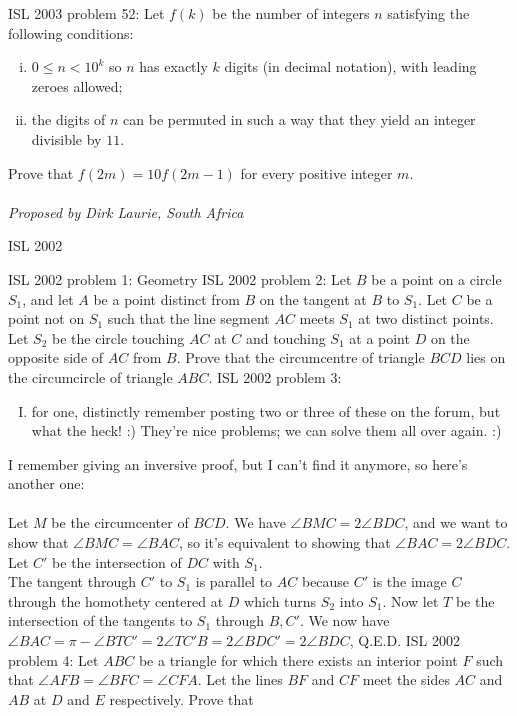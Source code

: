 ISL 2003 problem 52:  Let $f(k)$ be the number of integers $n$ satisfying the following conditions:
\begin{enumerate}[(i)]
  \item $0\leq n < 10^k$ so $n$ has exactly $k$ digits (in decimal notation), with leading zeroes allowed;
  \item the digits of $n$ can be permuted in such a way that they yield an integer divisible by $11$.
\end{enumerate}
Prove that $f(2m) = 10f(2m-1)$ for every positive integer $m$. \\\\
\textit{Proposed by Dirk Laurie, South Africa} 

ISL 2002 

ISL 2002 problem 1:  Geometry 
ISL 2002 problem 2:  Let $B$ be a point on a circle $S_1$, and let $A$ be a point distinct from $B$ on the tangent at $B$ to $S_1$. Let $C$ be a point not on $S_1$ such that the line segment $AC$ meets $S_1$ at two distinct points. Let $S_2$ be the circle touching $AC$ at $C$ and touching $S_1$ at a point $D$ on the opposite side of $AC$ from $B$.  Prove that the circumcentre of triangle $BCD$ lies on the circumcircle of triangle $ABC$. 
ISL 2002 problem 3:  \begin{enumerate}[I.]
  \item for one, distinctly remember posting two or three of these on the forum, but what the heck! :) They're nice problems; we can solve them all over again. :)
\end{enumerate}
I remember giving an inversive proof, but I can't find it anymore, so here's another one: \\\\
Let $M$ be the circumcenter of $BCD$. We have $\angle BMC=2\angle BDC$, and we want to show that $\angle BMC=\angle BAC$, so it's equivalent to showing that $\angle BAC=2\angle BDC$. Let $C'$ be the intersection of $DC$ with $S_1$. \\
The tangent through $C'$ to $S_1$ is parallel to $AC$ because $C'$ is the image $C$ through the homothety centered at $D$ which turns $S_2$ into $S_1$. Now let $T$ be the intersection of the tangents to $S_1$ through $B,C'$. We now have $\angle BAC=\pi-\angle BTC'=2\angle TC'B=2\angle BDC'=2\angle BDC$, Q.E.D. 
ISL 2002 problem 4:  Let $ABC$ be a triangle for which there exists an interior point $F$ such that $\angle AFB=\angle BFC=\angle CFA$. Let the lines $BF$ and $CF$ meet the sides $AC$ and $AB$ at $D$ and $E$ respectively. Prove that
